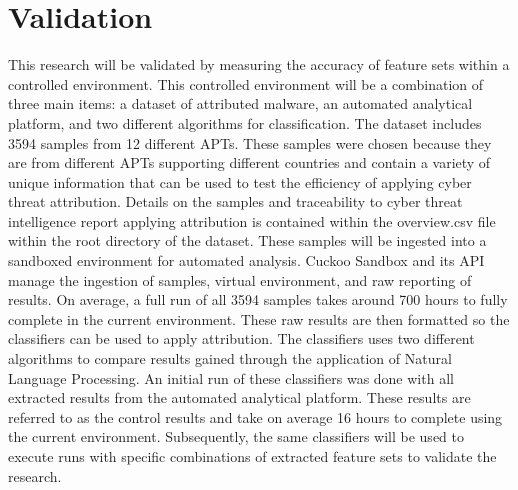 \documentclass[12pt]{report}
\begin{document}
\section{Validation}
This research will be validated by measuring the accuracy of feature sets within a controlled environment.  This controlled environment will be a combination of three main items: a dataset of attributed malware, an automated analytical platform, and two different algorithms for classification.  The dataset includes 3594 samples from 12 different APTs. \cite{APTMalware2022}  These samples were chosen because they are from different APTs supporting different countries and contain a variety of unique information that can be used to test the efficiency of applying cyber threat attribution.  Details on the samples and traceability to cyber threat intelligence report applying attribution is contained within the overview.csv file within the root directory of the dataset.  These samples will be ingested into a sandboxed environment for automated analysis.  Cuckoo Sandbox and its API manage the ingestion of samples, virtual environment, and raw reporting of results.  On average, a full run of all 3594 samples takes around 700 hours to fully complete in the current environment.  These raw results are then formatted so the classifiers can be used to apply attribution.  The classifiers uses two different algorithms to compare results gained through the application of Natural Language Processing.  An initial run of these classifiers was done with all extracted results from the automated analytical platform.  These results are referred to as the control results and take on average 16 hours to complete using the current environment.  Subsequently, the same classifiers will be used to execute runs with specific combinations of extracted feature sets to validate the research. 
\end{document}
